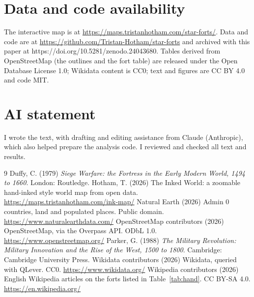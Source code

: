 \documentclass[11pt,a4paper]{article}
\begin{document}
\section*{Data and code availability}
The interactive map is at \url{https://maps.tristanhotham.com/star-forts/}. Data and code are at \url{https://github.com/Tristan-Hotham/star-forts} and archived with this paper at https://doi.org/10.5281/zenodo.24043680. Tables derived from OpenStreetMap (the outlines and the fort table) are released under the Open Database License 1.0; Wikidata content is CC0; text and figures are CC BY 4.0 and code MIT.

\section*{AI statement}
I wrote the text, with drafting and editing assistance from Claude (Anthropic), which also helped prepare the analysis code. I reviewed and checked all text and results.

\begin{thebibliography}{9}
 Duffy, C. (1979) \textit{Siege Warfare: the Fortress in the Early Modern World, 1494 to 1660}. London: Routledge.
 Hotham, T. (2026) The Inked World: a zoomable hand-inked style world map from open data. \url{https://maps.tristanhotham.com/ink-map/}
 Natural Earth (2026) Admin 0 countries, land and populated places. Public domain. \url{https://www.naturalearthdata.com/}
 OpenStreetMap contributors (2026) OpenStreetMap, via the Overpass API. ODbL 1.0. \url{https://www.openstreetmap.org/}
 Parker, G. (1988) \textit{The Military Revolution: Military Innovation and the Rise of the West, 1500 to 1800}. Cambridge: Cambridge University Press.
 Wikidata contributors (2026) Wikidata, queried with QLever. CC0. \url{https://www.wikidata.org/}
 Wikipedia contributors (2026) English Wikipedia articles on the forts listed in Table~\ref{tab:hand}. CC BY-SA 4.0. \url{https://en.wikipedia.org/}
\end{thebibliography}

\clearpage
\appendix
\end{document}
